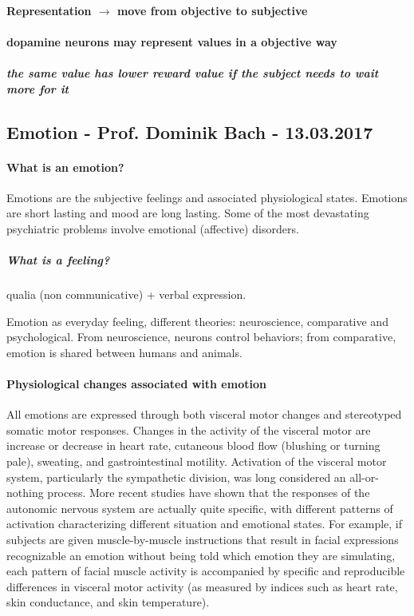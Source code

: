 \documentclass[12pt,article,oneside,a4paper]{memoir}
\begin{document}
\paragraph{Representation $\rightarrow$ move from objective to subjective}
\paragraph{dopamine neurons may represent values in a objective way}
\subparagraph{the same value has lower reward value if the subject needs to wait more for it}

\newpage
\subsection{Emotion - Prof. Dominik Bach - 13.03.2017}

\paragraph{What is an emotion?}
Emotions are the subjective feelings and associated physiological states.
Emotions are short lasting and mood are long lasting. Some of the most
devastating psychiatric problems involve emotional (affective) disorders.

\subparagraph{What is a feeling?}
qualia (non communicative) + verbal expression.

Emotion as everyday feeling, different theories: neuroscience, comparative and
psychological. From neuroscience, neurons control behaviors; from comparative, 
emotion is shared between humans and animals.

\paragraph{Physiological changes associated with emotion}
All emotions are expressed through both visceral motor changes and stereotyped
somatic motor responses. Changes in the activity of the visceral motor are 
increase or decrease in heart rate, cutaneous blood flow (blushing or turning 
pale), sweating, and gastrointestinal motility.
Activation of the visceral motor system, particularly the sympathetic division,
was long considered an all-or-nothing process. More recent studies have shown
that the responses of the autonomic nervous system are actually quite specific,
with different patterns of activation characterizing different situation and
emotional states. For example, if subjects are given muscle-by-muscle instructions
that result in facial expressions recognizable an emotion without being
told which emotion they are simulating, each pattern of facial muscle activity is
accompanied by specific and reproducible differences in visceral motor
activity (as measured by indices such as heart rate, skin conductance, and
skin temperature). 
\end{document}
